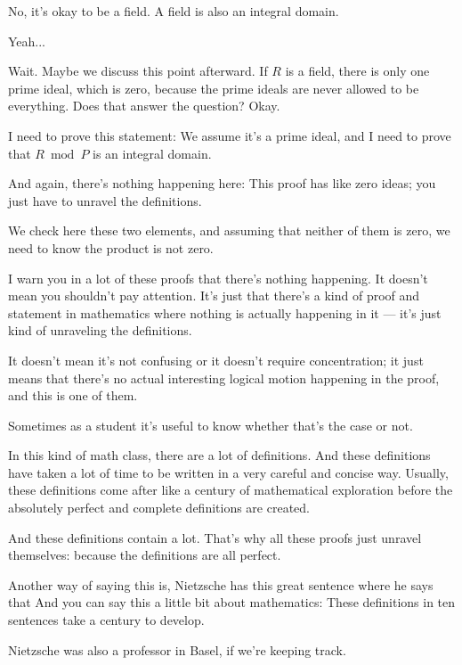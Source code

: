 \begin{speech}[00:57:40 - 00:58:06]
No, it's okay to be a field. A field is also an integral domain.

Yeah...

Wait. Maybe we discuss this point afterward. If $R$ is a field, there is only one prime ideal, which is zero, because the prime ideals are never allowed to be everything. Does that answer the question? Okay.
\end{speech}

\begin{speech}[00:58:07 - 00:58:38]
I need to prove this statement: We assume it's a prime ideal, and I need to prove that $R \bmod P$ is an integral domain.

And again, there's nothing happening here: This proof has like zero ideas; you just have to unravel the definitions.

We check here these two elements, and assuming that neither of them is zero, we need to know the product is not zero.
\end{speech}

\begin{speech}[00:58:38 - 01:00:16]
I warn you in a lot of these proofs that there's nothing happening. It doesn't mean you shouldn't pay attention. It's just that there's a kind of proof and statement in mathematics where nothing is actually happening in it --- it's just kind of unraveling the definitions.

It doesn't mean it's not confusing or it doesn't require concentration; it just means that there's no actual interesting logical motion happening in the proof, and this is one of them.

Sometimes as a student it's useful to know whether that's the case or not.

In this kind of math class, there are a lot of definitions. And these definitions have taken a lot of time to be written in a very careful and concise way. Usually, these definitions come after like a century of mathematical exploration before the absolutely perfect and complete definitions are created.

And these definitions contain a lot. That's why all these proofs just unravel themselves: because the definitions are all perfect.

Another way of saying this is, Nietzsche has this great sentence where he says that  And you can say this a little bit about mathematics: These definitions in ten sentences take a century to develop.

Nietzsche was also a professor in Basel, if we're keeping track.
\end{speech}


